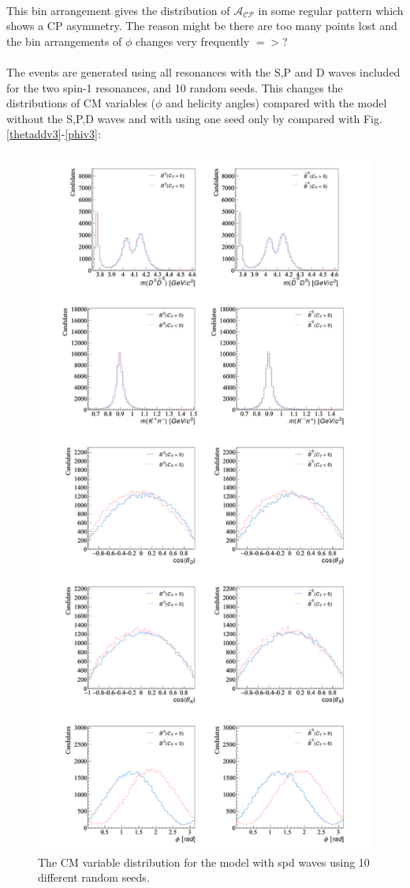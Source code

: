 \\
This bin arrangement gives the distribution of $\mathcal{A}_{\mathcal{C}\mathcal{P}}$ in some regular pattern which shows a CP asymmetry. The reason might be there are too many points lost and the bin arrangements of $\phi$ changes very frequently $=>$?
\\
\\
The events are generated using all resonances with the S,P and D waves included for the two spin-1 resonances, and 10 random seeds. This changes the distributions of CM variables ($\phi$ and helicity angles) compared with the model without the S,P,D waves and with using one seed only by compared with Fig.\ref{thetaddv3}-\ref{phiv3}:
\begin{figure}[h]
\center
\includegraphics*[width=0.66\linewidth]{binnedanalysis/CM_variable_all_factorspd_1E0.0_100000}
\caption{The CM variable distribution for the model with spd waves using 10 different random seeds.}
\label{CM_variables_new}
\end{figure}
